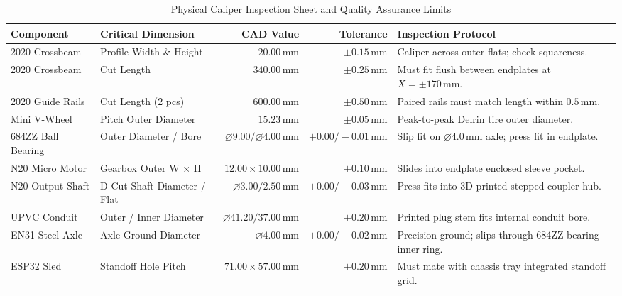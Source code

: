 \documentclass[10pt,a4paper]{article}
\begin{document}
\begin{table}[H]
\centering
\small
\begin{tabularx}{\textwidth}{p{4.2cm} p{4.2cm} r r X}
\toprule
\textbf{Component} & \textbf{Critical Dimension} & \textbf{CAD Value} & \textbf{Tolerance} & \textbf{Inspection Protocol} \\
\midrule
2020 Crossbeam & Profile Width \& Height & $20.00\,\text{mm}$ & $\pm 0.15\,\text{mm}$ & Caliper across outer flats; check squareness. \\
2020 Crossbeam & Cut Length & $340.00\,\text{mm}$ & $\pm 0.25\,\text{mm}$ & Must fit flush between endplates at $X = \pm 170\,\text{mm}$. \\
2020 Guide Rails & Cut Length (2 pcs) & $600.00\,\text{mm}$ & $\pm 0.50\,\text{mm}$ & Paired rails must match length within $0.5\,\text{mm}$. \\
Mini V-Wheel & Pitch Outer Diameter & $15.23\,\text{mm}$ & $\pm 0.05\,\text{mm}$ & Peak-to-peak Delrin tire outer diameter. \\
684ZZ Ball Bearing & Outer Diameter / Bore & $\varnothing 9.00 / \varnothing 4.00\,\text{mm}$ & $+0.00 / -0.01\,\text{mm}$ & Slip fit on $\varnothing 4.0\,\text{mm}$ axle; press fit in endplate. \\
N20 Micro Motor & Gearbox Outer W $\times$ H & $12.00 \times 10.00\,\text{mm}$ & $\pm 0.10\,\text{mm}$ & Slides into endplate enclosed sleeve pocket. \\
N20 Output Shaft & D-Cut Shaft Diameter / Flat & $\varnothing 3.00 / 2.50\,\text{mm}$ & $+0.00 / -0.03\,\text{mm}$ & Press-fits into 3D-printed stepped coupler hub. \\
UPVC Conduit & Outer / Inner Diameter & $\varnothing 41.20 / 37.00\,\text{mm}$ & $\pm 0.20\,\text{mm}$ & Printed plug stem fits internal conduit bore. \\
EN31 Steel Axle & Axle Ground Diameter & $\varnothing 4.00\,\text{mm}$ & $+0.00 / -0.02\,\text{mm}$ & Precision ground; slips through 684ZZ bearing inner ring. \\
ESP32 Sled & Standoff Hole Pitch & $71.00 \times 57.00\,\text{mm}$ & $\pm 0.20\,\text{mm}$ & Must mate with chassis tray integrated standoff grid. \\
\bottomrule
\end{tabularx}
\caption{Physical Caliper Inspection Sheet and Quality Assurance Limits}
\label{tab:caliper_inspection}
\end{table}

\clearpage
\end{document}
